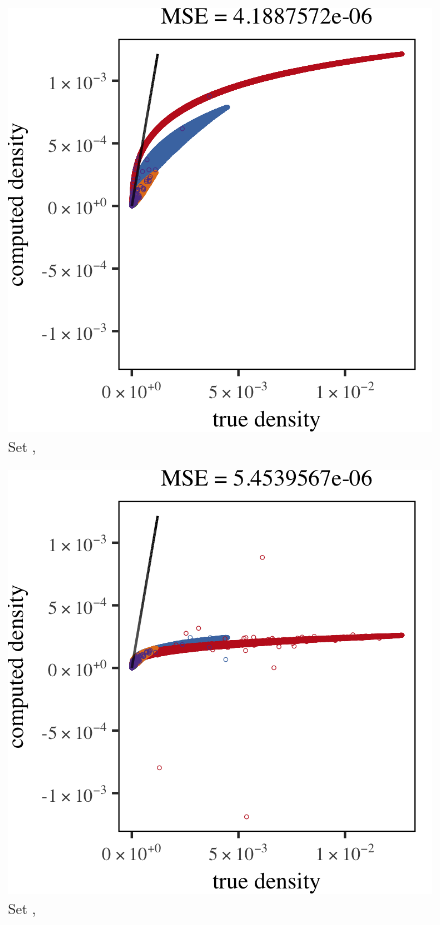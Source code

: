 \begin{subfigure}{0.23\textwidth}
	\centering
	\includegraphics[keepaspectratio=true, width=\textwidth, height=0.23\textheight]{4/img/all/results_baakman_3_120000_mbe_silverman}
	\caption{Set \baakmanThree, \mbe}
	\label{fig:4:results:mbe:baakman3}
\end{subfigure}	
\begin{subfigure}{0.23\textwidth}
	\centering
	\includegraphics[keepaspectratio=true, width=\textwidth, height=0.23\textheight]{4/img/all/results_baakman_3_120000_sambe_silverman}
	\caption{Set \baakmanThree, \sambe}
	\label{fig:4:results:sambe:baakman3}
\end{subfigure}	